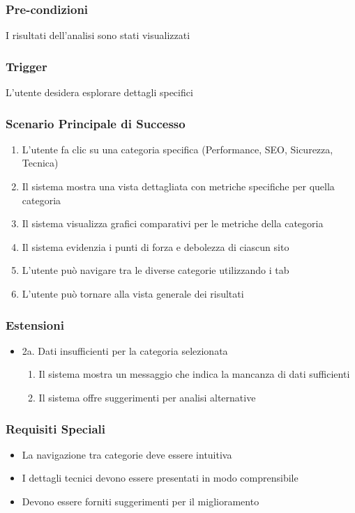 \subsubsection{Pre-condizioni}
I risultati dell'analisi sono stati visualizzati

\subsubsection{Trigger}
L'utente desidera esplorare dettagli specifici

\subsubsection{Scenario Principale di Successo}
\begin{enumerate}
    \item L'utente fa clic su una categoria specifica (Performance, SEO, Sicurezza, Tecnica)
    \item Il sistema mostra una vista dettagliata con metriche specifiche per quella categoria
    \item Il sistema visualizza grafici comparativi per le metriche della categoria
    \item Il sistema evidenzia i punti di forza e debolezza di ciascun sito
    \item L'utente può navigare tra le diverse categorie utilizzando i tab
    \item L'utente può tornare alla vista generale dei risultati
\end{enumerate}

\subsubsection{Estensioni}
\begin{itemize}
    \item 2a. Dati insufficienti per la categoria selezionata
    \begin{enumerate}
        \item Il sistema mostra un messaggio che indica la mancanza di dati sufficienti
        \item Il sistema offre suggerimenti per analisi alternative
    \end{enumerate}
\end{itemize}

\subsubsection{Requisiti Speciali}
\begin{itemize}
    \item La navigazione tra categorie deve essere intuitiva
    \item I dettagli tecnici devono essere presentati in modo comprensibile
    \item Devono essere forniti suggerimenti per il miglioramento
\end{itemize}

